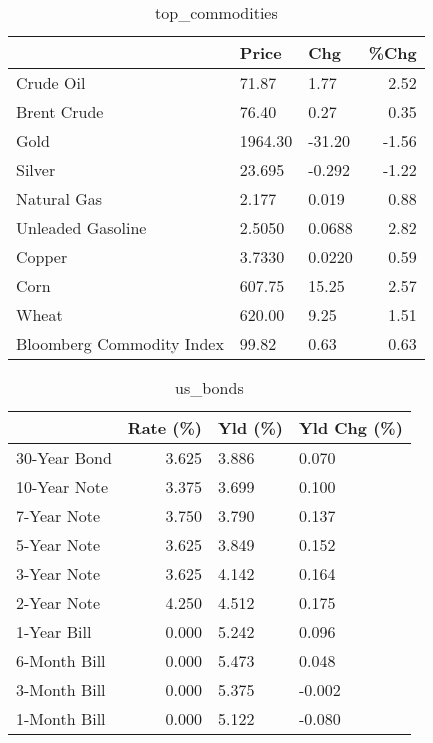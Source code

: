 \documentclass{article}%
\begin{document}
\begin{table}[htbp]%
\caption{top\_commodities}%
\centering%
\begin{adjustbox}{width=1\textwidth}%
\begin{tabular}{lllr}
\toprule
                          &   Price &    Chg &  \%Chg \\
\midrule
               Crude Oil  &   71.87 &   1.77 &  2.52 \\
             Brent Crude  &   76.40 &   0.27 &  0.35 \\
                    Gold  & 1964.30 & -31.20 & -1.56 \\
                  Silver  &  23.695 & -0.292 & -1.22 \\
             Natural Gas  &   2.177 &  0.019 &  0.88 \\
       Unleaded Gasoline  &  2.5050 & 0.0688 &  2.82 \\
                  Copper  &  3.7330 & 0.0220 &  0.59 \\
                    Corn  &  607.75 &  15.25 &  2.57 \\
                   Wheat  &  620.00 &   9.25 &  1.51 \\
Bloomberg Commodity Index &   99.82 &   0.63 &  0.63 \\
\bottomrule
\end{tabular}
%
\end{adjustbox}%
\end{table}

%


\begin{table}[htbp]%
\caption{us\_bonds}%
\centering%
\begin{adjustbox}{width=1\textwidth}%
\begin{tabular}{lrll}
\toprule
             &  Rate (\%) & Yld (\%) & Yld Chg (\%) \\
\midrule
30-Year Bond &     3.625 &   3.886 &       0.070 \\
10-Year Note &     3.375 &   3.699 &       0.100 \\
 7-Year Note &     3.750 &   3.790 &       0.137 \\
 5-Year Note &     3.625 &   3.849 &       0.152 \\
 3-Year Note &     3.625 &   4.142 &       0.164 \\
 2-Year Note &     4.250 &   4.512 &       0.175 \\
 1-Year Bill &     0.000 &   5.242 &       0.096 \\
6-Month Bill &     0.000 &   5.473 &       0.048 \\
3-Month Bill &     0.000 &   5.375 &      -0.002 \\
1-Month Bill &     0.000 &   5.122 &      -0.080 \\
\bottomrule
\end{tabular}
%
\end{adjustbox}%
\end{table}
\end{document}
